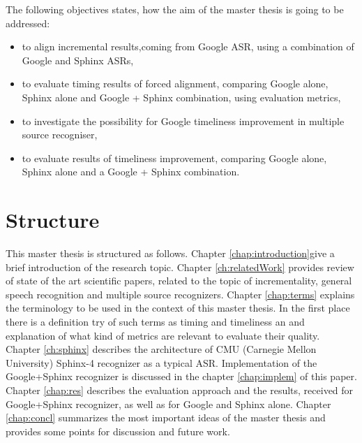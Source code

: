 The following objectives states, how the aim of the master thesis is going to be
addressed:
 \begin  {itemize}
   \item to align incremental results,coming from Google ASR, using a
   combination of Google and Sphinx ASRs,
   \item to evaluate timing results of forced alignment, comparing Google
   alone, Sphinx alone and Google + Sphinx combination, using evaluation
   metrics,
   \item to investigate the possibility for Google timeliness improvement in
   multiple source recogniser,
   \item to evaluate results of timeliness improvement, comparing Google alone,
   Sphinx alone and a Google + Sphinx combination.
 \end {itemize}


\section {Structure}
This master thesis is structured as follows. Chapter \ref{chap:introduction}give
a brief introduction of the research topic. Chapter \ref{ch:relatedWork}
provides review of state of the art scientific papers, related to the topic of
incrementality, general speech recognition and multiple source recognizers.
Chapter \ref{chap:terms} explains the terminology to be used in the context of this master thesis.  
In the first place there is a definition try of such terms as timing and
timeliness an and explanation of what kind of metrics are relevant to
evaluate their quality. Chapter \ref{ch:sphinx} describes the architecture of
CMU (Carnegie Mellon University) Sphinx-4 recognizer as a typical ASR.
Implementation of the Google+Sphinx recognizer is discussed in the chapter
\ref{chap:implem} of this paper. Chapter \ref{chap:res} describes the evaluation
approach and the results, received for Google+Sphinx recognizer, as well as for
Google and Sphinx alone.
Chapter \ref{chap:concl} summarizes the most important ideas of the master
thesis and provides some points for discussion and future work.
